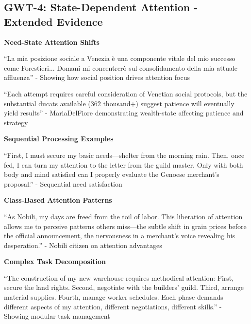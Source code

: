 \documentclass[12pt,a4paper]{article}
\begin{document}
\subsection{GWT-4: State-Dependent Attention - Extended Evidence}

\textbf{Need-State Attention Shifts}

\begin{displayquote}
``La mia posizione sociale a Venezia è una componente vitale del mio successo come Forestieri... Domani mi concentrerò sul consolidamento della mia attuale affluenza'' - Showing how social position drives attention focus
\end{displayquote}

\begin{displayquote}
``Each attempt requires careful consideration of Venetian social protocols, but the substantial ducats available (362 thousand+) suggest patience will eventually yield results'' - MariaDelFiore demonstrating wealth-state affecting patience and strategy
\end{displayquote}

\textbf{Sequential Processing Examples}

\begin{displayquote}
``First, I must secure my basic needs—shelter from the morning rain. Then, once fed, I can turn my attention to the letter from the guild master. Only with both body and mind satisfied can I properly evaluate the Genoese merchant's proposal.'' - Sequential need satisfaction
\end{displayquote}

\textbf{Class-Based Attention Patterns}

\begin{displayquote}
``As Nobili, my days are freed from the toil of labor. This liberation of attention allows me to perceive patterns others miss—the subtle shift in grain prices before the official announcement, the nervousness in a merchant's voice revealing his desperation.'' - Nobili citizen on attention advantages
\end{displayquote}

\textbf{Complex Task Decomposition}

\begin{displayquote}
``The construction of my new warehouse requires methodical attention: First, secure the land rights. Second, negotiate with the builders' guild. Third, arrange material supplies. Fourth, manage worker schedules. Each phase demands different aspects of my attention, different negotiations, different skills.'' - Showing modular task management
\end{displayquote}
\end{document}
